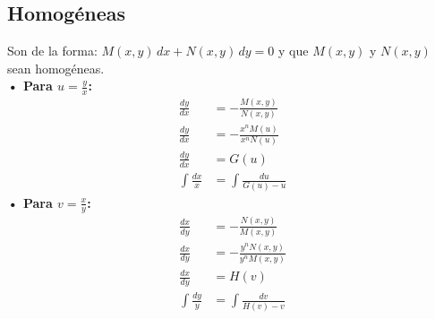 \documentclass[letterpaper, 12pt]{article}
\begin{document}
\begin{justify}
        \subsection*{Homogéneas}
        \justify
        Son de la forma: \(M(x,y)\, dx+N(x,y)\, dy=0\) y que \(M(x,y)\) y \(N(x,y)\) sean homogéneas.
        \\\newline
        \textbf{• Para \(u=\frac{y}{x}\):}
        {\large\begin{equation*}
            \begin{aligned}
                \frac{dy}{dx}&=-\frac{M(x,y)}{N(x,y)}\\[5pt]
                \frac{dy}{dx}&=-\frac{x^nM(u)}{x^nN(u)}\\[5pt]
                \frac{dy}{dx}&=G(u)\\[5pt]
                \int \frac{dx}{x}&=\int \frac{du}{G(u)-u}
            \end{aligned}
        \end{equation*}}
        \justify
        \textbf{• Para \(v=\frac{x}{y}\):}
        {\large\begin{equation*}
            \begin{aligned}
                \frac{dx}{dy}&=-\frac{N(x,y)}{M(x,y)}\\[5pt]
                \frac{dx}{dy}&=-\frac{y^nN(x,y)}{y^nM(x,y)}\\[5pt]
                \frac{dx}{dy}&=H(v)\\[5pt]
                \int \frac{dy}{y}&=\int \frac{dv}{H(v)-v}
            \end{aligned}
        \end{equation*}}

\end{justify}
\end{document}
